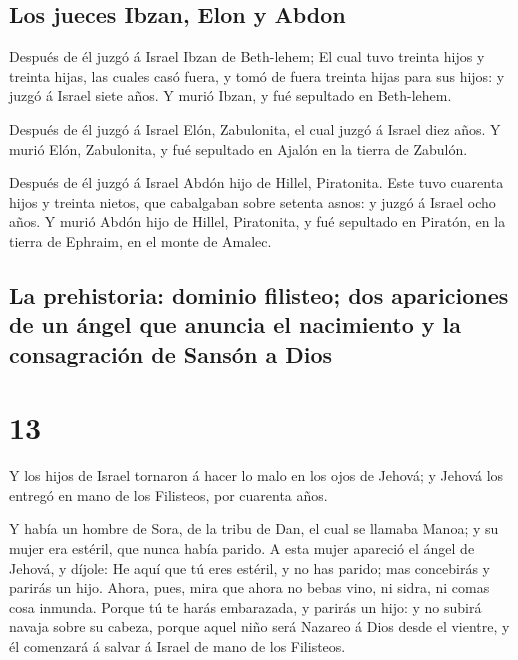 \hypertarget{los-jueces-ibzan-elon-y-abdon}{%
\subsection{Los jueces Ibzan, Elon y
Abdon}\label{los-jueces-ibzan-elon-y-abdon}}

 Después de él juzgó á Israel Ibzan de Beth-lehem;
 El cual tuvo treinta hijos y treinta hijas, las cuales casó
fuera, y tomó de fuera treinta hijas para sus hijos: y juzgó á Israel
siete años.  Y murió Ibzan, y fué sepultado en Beth-lehem.

 Después de él juzgó á Israel Elón, Zabulonita, el cual
juzgó á Israel diez años.  Y murió Elón, Zabulonita, y fué
sepultado en Ajalón en la tierra de Zabulón.

 Después de él juzgó á Israel Abdón hijo de Hillel,
Piratonita.  Este tuvo cuarenta hijos y treinta nietos, que
cabalgaban sobre setenta asnos: y juzgó á Israel ocho años.
 Y murió Abdón hijo de Hillel, Piratonita, y fué sepultado
en Piratón, en la tierra de Ephraim, en el monte de Amalec.

\hypertarget{la-prehistoria-dominio-filisteo-dos-apariciones-de-un-uxe1ngel-que-anuncia-el-nacimiento-y-la-consagraciuxf3n-de-sansuxf3n-a-dios}{%
\subsection{La prehistoria: dominio filisteo; dos apariciones de un
ángel que anuncia el nacimiento y la consagración de Sansón a
Dios}\label{la-prehistoria-dominio-filisteo-dos-apariciones-de-un-uxe1ngel-que-anuncia-el-nacimiento-y-la-consagraciuxf3n-de-sansuxf3n-a-dios}}

\hypertarget{section-12}{%
\section{13}\label{section-12}}

 Y los hijos de Israel tornaron á hacer lo malo en los ojos
de Jehová; y Jehová los entregó en mano de los Filisteos, por cuarenta
años.

 Y había un hombre de Sora, de la tribu de Dan, el cual se
llamaba Manoa; y su mujer era estéril, que nunca había parido.
 A esta mujer apareció el ángel de Jehová, y díjole: He aquí
que tú eres estéril, y no has parido; mas concebirás y parirás un hijo.
 Ahora, pues, mira que ahora no bebas vino, ni sidra, ni
comas cosa inmunda.  Porque tú te harás embarazada, y
parirás un hijo: y no subirá navaja sobre su cabeza, porque aquel niño
será Nazareo á Dios desde el vientre, y él comenzará á salvar á Israel
de mano de los Filisteos.

